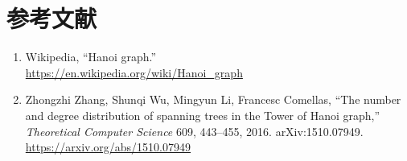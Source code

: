 \documentclass[a4paper,11pt]{ltjsarticle}
\theoremstyle{definition}
\theoremstyle{plain}
\theoremstyle{remark}
\begin{document}
\section*{参考文献}

\begin{enumerate}[leftmargin=1.7em]
\item Wikipedia, ``Hanoi graph.'' \\
\url{https://en.wikipedia.org/wiki/Hanoi_graph}
\item Zhongzhi Zhang, Shunqi Wu, Mingyun Li, Francesc Comellas,
``The number and degree distribution of spanning trees in the Tower of Hanoi graph,''
\textit{Theoretical Computer Science} 609, 443--455, 2016. arXiv:1510.07949.\\
\url{https://arxiv.org/abs/1510.07949}
\end{enumerate}
\end{document}
